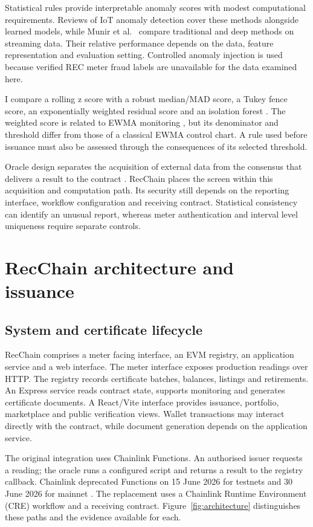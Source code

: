 \documentclass[11pt,a4paper]{article}
\begin{document}
Statistical rules provide interpretable anomaly scores with modest computational requirements. Reviews of IoT anomaly detection \cite{fahim,nassif} cover these methods alongside learned models, while Munir et al.\ \cite{munir} compare traditional and deep methods on streaming data. Their relative performance depends on the data, feature representation and evaluation setting. Controlled anomaly injection is used because verified REC meter fraud labels are unavailable for the data examined here.

I compare a rolling z score with a robust median/MAD score, a Tukey fence score, an exponentially weighted residual score and an isolation forest \cite{tukey,isolation}. The weighted score is related to EWMA monitoring \cite{montgomery}, but its denominator and threshold differ from those of a classical EWMA control chart. A rule used before issuance must also be assessed through the consequences of its selected threshold.

Oracle design separates the acquisition of external data from the consensus that delivers a result to the contract \cite{chainlink2,pasdar}. RecChain places the screen within this acquisition and computation path. Its security still depends on the reporting interface, workflow configuration and receiving contract. Statistical consistency can identify an unusual report, whereas meter authentication and interval level uniqueness require separate controls.

\section{RecChain architecture and issuance}
\subsection{System and certificate lifecycle}
RecChain comprises a meter facing interface, an EVM registry, an application service and a web interface. The meter interface exposes production readings over HTTP. The registry records certificate batches, balances, listings and retirements. An Express service reads contract state, supports monitoring and generates certificate documents. A React/Vite interface provides issuance, portfolio, marketplace and public verification views. Wallet transactions may interact directly with the contract, while document generation depends on the application service.

The original integration uses Chainlink Functions. An authorised issuer requests a reading; the oracle runs a configured script and returns a result to the registry callback. Chainlink deprecated Functions on 15 June 2026 for testnets and 30 June 2026 for mainnet \cite{functions}. The replacement uses a Chainlink Runtime Environment (CRE) workflow and a receiving contract. Figure~\ref{fig:architecture} distinguishes these paths and the evidence available for each.
\end{document}
